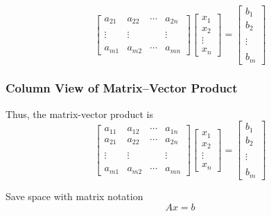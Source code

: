 \documentclass[10pt]{beamer}
\begin{document}
\begin{frame}
\begin{equation*}
\begin{bmatrix}
                    a_{21} & a_{22} & \cdots & a_{2n} \\
                           &        &        &        \\
                    \vdots & \vdots &        & \vdots \\
                           &        &        &        \\
                    a_{m1} & a_{m2} & \cdots & a_{mn}
    \end{bmatrix}
    \begin{bmatrix} x_1 \\ x_2 \\ \vdots \\ x_n \end{bmatrix}
    =
    \begin{bmatrix} b_1 \\ b_2 \\  \\ \vdots \\ \\ b_m\end{bmatrix}
\end{equation*}

\end{frame}
\begin{frame}
\frametitle{Column View of Matrix--Vector Product}

Thus, the matrix-vector product is
\begin{equation*}
    \begin{bmatrix} a_{11} & a_{12} & \cdots & a_{1n} \\
                    a_{21} & a_{22} & \cdots & a_{2n} \\
                           &        &        &        \\
                    \vdots & \vdots &        & \vdots \\
                           &        &        &        \\
                    a_{m1} & a_{m2} & \cdots & a_{mn}
    \end{bmatrix}
    \begin{bmatrix} x_1 \\ x_2 \\ \vdots \\ x_n \end{bmatrix}
    =
    \begin{bmatrix} b_1 \\ b_2 \\  \\ \vdots \\ \\ b_m\end{bmatrix}
\end{equation*}

Save space with matrix notation
\begin{equation*}
    Ax = b
\end{equation*}

\end{frame}
\end{document}
